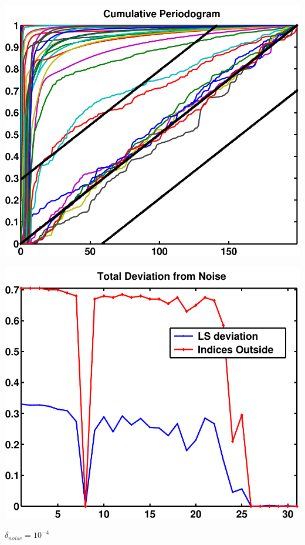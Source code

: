 \documentclass[11pt]{amsart}
\begin{document}
	\vspace{5mm}
	\begin{minipage}[t]{0.5\textwidth}
	
		\includegraphics[width=.95\linewidth]{figures/run3/cum_per} 
   
	\end{minipage}
	\begin{minipage}[t]{0.5\textwidth}
	
		\includegraphics[width=.95\linewidth]{figures/run3/total_deviation} 
   
	\end{minipage}
	\vspace{5mm}
	{\centering $\delta_{noise}=10^{-4}$}
	
\end{document}
